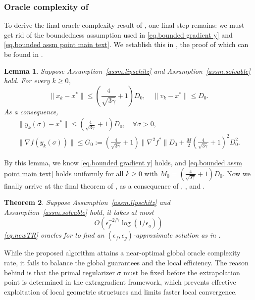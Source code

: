 \documentclass{article}
\newtheorem{theorem}{Theorem}[section]
\newtheorem{lemma}[theorem]{Lemma}
\numberwithin{equation}{section}
\numberwithin{equation}{section}
\begin{document}
\subsubsection{Oracle complexity of }
To derive the final oracle complexity result of , one final step remains: we must get rid of the boundedness assumption used in \eqref{eq.bounded gradient y} and \eqref{eq.bounded assm point main text}. We establish this in , the proof of which can be found in .
\begin{lemma}
    \label{lem.bounded iterate}
    Suppose Assumption~\ref{assm.lipschitz} and Assumption~\ref{assm.solvable} hold. For every $k\geq 0$,
    \begin{equation}
        \label{eq.bounded iterate}
        \|x_k- x^*\| \leq \left(\frac{4}{\sqrt{3\gamma}}+1\right)D_0, \quad \|v_k-x^*\|\leq D_0.
    \end{equation}
    As a consequence,
    \begin{gather}
        \label{eq.bounded iterate y}
        \|y_k(\sigma)-x^*\| \leq \left(\frac{4}{\sqrt{3\gamma}}+1\right)D_0, \quad \forall \sigma>0,\\
        \label{eq.ub yk sigma}
        \|\nabla f(y_k(\sigma))\| \leq G_0:= \left(\frac{4}{\sqrt{3\gamma}}+1\right)\|\nabla ^2 f^*\|D_0+\frac{M}{2}\left(\frac{4}{\sqrt{3\gamma}}+1\right)^2 D_0^2.
    \end{gather}
\end{lemma}
By this lemma, we know \eqref{eq.bounded gradient y} holds, and \eqref{eq.bounded assm point main text} holds uniformly for all $k\geq0$ with $M_0 =\left(\frac{4}{\sqrt{3\gamma}}+1\right)D_0 $. Now we finally arrive at the final theorem of , as a consequence of , , and .
\begin{theorem}
    \label{thm.final complexity of msatr}
    Suppose Assumption~\ref{assm.lipschitz} and Assumption~\ref{assm.solvable} hold, it takes at most
    \begin{equation}
        \label{eq.final complexity of msatr}
        O\left(\epsilon_f^{-2/7}\log\left(1/\epsilon_g\right)\right)
    \end{equation}
    \ref{eq.newTR} oracles for  to find an $(\epsilon_f,\epsilon_g)$-approximate solution as in .
\end{theorem}
While the proposed algorithm attains a near-optimal global oracle complexity rate, it fails to balance the global guarantees and the local efficiency. The reason behind is that the primal regularizer $\sigma$ must be fixed before the extrapolation point is determined in the extragradient framework, which prevents effective exploitation of local geometric structures and limits faster local convergence.
\end{document}
